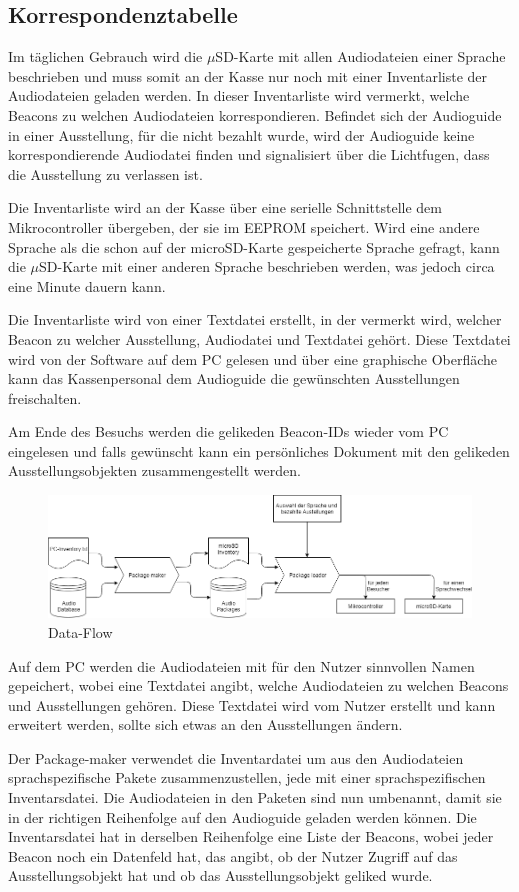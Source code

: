 \subsection{Korrespondenztabelle}
\thispagestyle{fancy}
Im täglichen Gebrauch wird die $\mu$SD-Karte mit allen Audiodateien einer Sprache beschrieben und muss somit an der Kasse nur noch mit einer Inventarliste der Audiodateien geladen werden.
In dieser Inventarliste wird vermerkt, welche Beacons zu welchen Audiodateien korrespondieren.
Befindet sich der Audioguide in einer Ausstellung, für die nicht bezahlt wurde, wird der Audioguide keine korrespondierende Audiodatei finden und signalisiert über die Lichtfugen, dass die Ausstellung zu verlassen ist.

Die Inventarliste wird an der Kasse über eine serielle Schnittstelle dem Mikrocontroller übergeben, der sie im EEPROM speichert.
Wird eine andere Sprache als die schon auf der microSD-Karte gespeicherte Sprache gefragt, kann die $\mu$SD-Karte mit einer anderen Sprache beschrieben werden, was jedoch circa eine Minute dauern kann.

Die Inventarliste wird von einer Textdatei erstellt, in der vermerkt wird, welcher Beacon zu welcher Ausstellung, Audiodatei und Textdatei gehört.
Diese Textdatei wird von der Software auf dem PC gelesen und über eine graphische Oberfläche kann das Kassenpersonal dem Audioguide die gewünschten Ausstellungen freischalten.

Am Ende des Besuchs werden die gelikeden Beacon-IDs wieder vom PC eingelesen und falls gewünscht kann ein persönliches Dokument mit den gelikeden Ausstellungsobjekten zusammengestellt werden.

\begin{figure}[H]
	\centering
	\includegraphics[width=\textwidth]{Bilder/data_flow.png}
	\caption{Data-Flow}
	\label{fig:data-flow}
\end{figure}

Auf dem PC werden die Audiodateien mit für den Nutzer sinnvollen Namen gepeichert, wobei eine Textdatei angibt, welche Audiodateien zu welchen Beacons und Ausstellungen gehören.
Diese Textdatei wird vom Nutzer erstellt und kann erweitert werden, sollte sich etwas an den Ausstellungen ändern.

Der Package-maker verwendet die Inventardatei um aus den Audiodateien sprachspezifische Pakete zusammenzustellen, jede mit einer sprachspezifischen Inventarsdatei.
Die Audiodateien in den Paketen sind nun umbenannt, damit sie in der richtigen Reihenfolge auf den Audioguide geladen werden können.
Die Inventarsdatei hat in derselben Reihenfolge eine Liste der Beacons, wobei jeder Beacon noch ein Datenfeld hat, das angibt, ob der Nutzer Zugriff auf das Ausstellungsobjekt hat und ob das Ausstellungsobjekt geliked wurde.
\newpage
